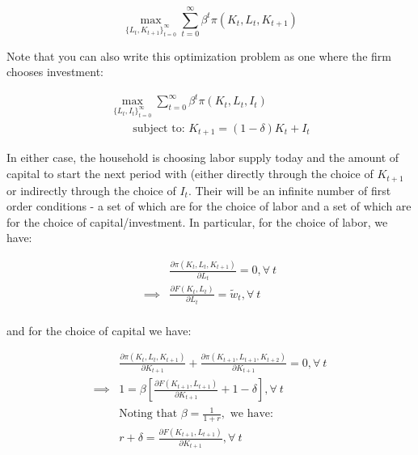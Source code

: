 \documentclass[letterpaper,12pt]{article}
\theoremstyle{definition}
\begin{document}
\begin{spacing}{1.5}
\begin{equation}
\label{eqn:firm_seq_prob}
\max_{\{L_{t},K_{t+1}\}^{\infty}_{t=0}} \sum_{t=0}^{\infty} \beta^{t}\pi(K_{t},L_{t},K_{t+1})
\end{equation}

Note that you can also write this optimization problem as one where the firm chooses investment:

\begin{equation}
\label{eqn:firm_seq_prob2}
\begin{split}
\max_{\{L_{t},I_{t}\}^{\infty}_{t=0}} \sum_{t=0}^{\infty} \beta^{t}\pi(K_{t},L_{t},I_{t}) \\
\quad\quad \text{subject to: } K_{t+1} = (1-\delta)K_{t} + I_{t} 
\end{split}
\end{equation}

In either case, the household is choosing labor supply today and the amount of capital to start the next period with (either directly through the choice of $K_{t+1}$ or indirectly through the choice of $I_{t}$.  Their will be an infinite number of first order conditions - a set of which are for the choice of labor and a set of which are for the choice of capital/investment.  In particular, for the choice of labor, we have:

\begin{equation}
\label{eqn:dyn_firm_foc_l}
\begin{split}
&\frac{\partial \pi(K_{t},L_{t},K_{t+1})}{\partial L_{t}} = 0, \forall \ t \\
 \implies & \frac{\partial F(K_{t}, L_{t})}{\partial L_{t}} = \tilde{w}_{t}, \forall \ t \\
\end{split}
\end{equation}

and for the choice of capital we have:

\begin{equation}
\label{eqn:dyn_firm_foc_k}
\begin{split}
&\frac{\partial \pi(K_{t},L_{t},K_{t+1})}{\partial K_{t+1}} + \frac{\partial \pi(K_{t+1},L_{t+1},K_{t+2})}{\partial K_{t+1}} = 0, \forall \ t \\
 \implies & 1 = \beta \left[ \frac{\partial F(K_{t+1}, L_{t+1})}{\partial K_{t+1}}  + 1 - \delta\right], \forall \ t \\
 & \text{Noting that } \beta= \frac{1}{1+r}, \text{ we have: } \\
  & r+\delta =  \frac{\partial F(K_{t+1}, L_{t+1})}{\partial K_{t+1}} , \forall \ t 
\end{split}
\end{equation}


\end{spacing}
\end{document}
